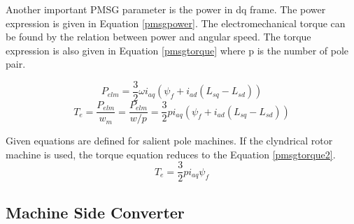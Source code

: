 Another important PMSG parameter is the power in dq frame. The power expression is given in Equation \ref{pmsgpower}. The electromechanical torque can be found by the relation between power and angular speed. The torque expression is also given in Equation \ref{pmsgtorque} where p is the number of pole pair.

\begin{equation}
P_{elm}=\frac{3}{2}\omega i_{aq} (\psi_{f}+i_{ad}(L_{sq}-L_{sd}))
\label{pmsgpower}
\end{equation}
\begin{equation}
T_{e}=\frac{P_{elm}}{w_{m}}=\frac{P_{elm}}{w/p}=\frac{3}{2}p i_{aq} (\psi_{f}+i_{ad}(L_{sq}-L_{sd}))
\label{pmsgtorque}
\end{equation}

Given equations are defined for salient pole machines. If the clyndrical rotor machine is used, the torque equation reduces to the Equation \ref{pmsgtorque2}.
\begin{equation}
T_{e}=\frac{3}{2}p i_{aq} \psi_{f}
\label{pmsgtorque2}
\end{equation}

\subsection{Machine Side Converter}

